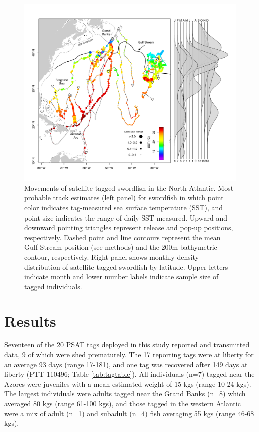 \begin{figure}[htbp]
\centering
\includegraphics[width=\textwidth]{images/C4_Fig1.pdf}
\caption[Movements of satellite-tagged swordfish in the North Atlantic]{Movements of satellite-tagged swordfish in the North Atlantic. Most probable track estimates (left panel) for swordfish in which point color indicates tag-measured sea surface temperature (SST), and point size indicates the range of daily SST measured. Upward and downward pointing triangles represent release and pop-up positions, respectively. Dashed point and line contours represent the mean Gulf Stream position (see methods) and the 200m bathymetric contour, respectively. Right panel shows monthly density distribution of satellite-tagged swordfish by latitude. Upper letters indicate month and lower number labels indicate sample size of tagged individuals.}
\label{fig:c4f1}
\end{figure}

\section{Results}

Seventeen of the 20 PSAT tags deployed in this study reported and transmitted data, 9 of which were shed prematurely. The 17 reporting tags were at liberty for an average 93 days (range 17-181), and one tag was recovered after 149 days at liberty (PTT 110496; Table \ref{tab:tagtable}). All individuals (n=7) tagged near the Azores were juveniles with a mean estimated weight of 15 kgs (range 10-24 kgs). The largest individuals were adults tagged near the Grand Banks (n=8) which averaged 80 kgs (range 61-100 kgs), and those tagged in the western Atlantic were a mix of adult (n=1) and subadult (n=4) fish averaging 55 kgs (range 46-68 kgs).

